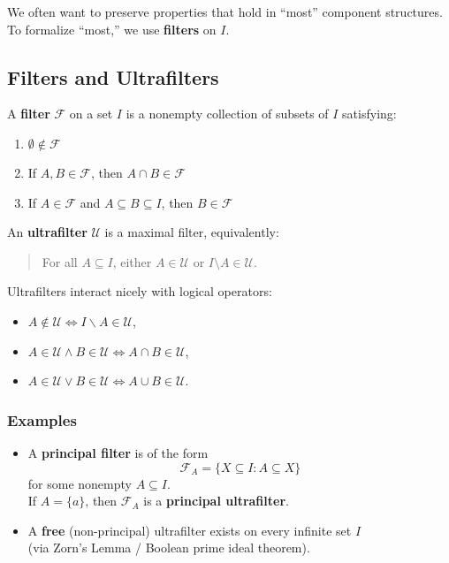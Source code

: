 \documentclass[
]{article}
\providecommand{\tightlist}{%
  \setlength{\itemsep}{0pt}\setlength{\parskip}{0pt}}
\theoremstyle{definition}
\theoremstyle{plain}
\theoremstyle{plain}
\theoremstyle{remark}
\begin{document}
We often want to preserve properties that hold in ``most'' component
structures.\\
To formalize ``most,'' we use \textbf{filters} on \(I\).

\subsection{Filters and Ultrafilters}\label{filters-and-ultrafilters}

A \textbf{filter} \(\mathcal{F}\) on a set \(I\) is a nonempty
collection of subsets of \(I\) satisfying:

\begin{enumerate}
\def\labelenumi{\arabic{enumi}.}
\tightlist
\item
  \(\emptyset \notin \mathcal{F}\)\\
\item
  If \(A,B \in \mathcal{F}\), then \(A \cap B \in \mathcal{F}\)\\
\item
  If \(A \in \mathcal{F}\) and \(A \subseteq B \subseteq I\), then
  \(B \in \mathcal{F}\)
\end{enumerate}

An \textbf{ultrafilter} \(\mathcal{U}\) is a maximal filter,
equivalently:

\begin{quote}
For all \(A \subseteq I\), either \(A \in \mathcal{U}\) or
\(I \setminus A \in \mathcal{U}\).
\end{quote}

Ultrafilters interact nicely with logical operators:

\begin{itemize}
\tightlist
\item
  \(A \not \in \mathcal{U} \iff I \backslash A \in \mathcal{U}\),
\item
  \(A  \in \mathcal{U} \wedge B \in \mathcal{U} \iff A \cap B \in \mathcal{U}\),
\item
  \(A  \in \mathcal{U} \vee B \in \mathcal{U} \iff A \cup B \in \mathcal{U}\).
\end{itemize}

\subsubsection{Examples}\label{examples}

\begin{itemize}
\item
  A \textbf{principal filter} is of the form\\
  \[
  \mathcal{F}_A = \{ X \subseteq I : A \subseteq X \}
  \] for some nonempty \(A \subseteq I\).\\
  If \(A = \{a\}\), then \(\mathcal{F}_A\) is a \textbf{principal
  ultrafilter}.
\item
  A \textbf{free} (non-principal) ultrafilter exists on every infinite
  set \(I\)\\
  (via Zorn's Lemma / Boolean prime ideal theorem).
\end{itemize}
\end{document}
